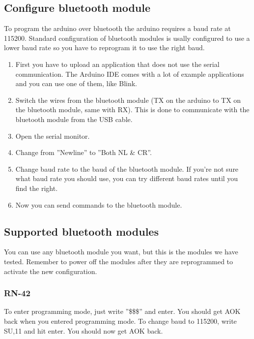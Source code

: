 		
		
		\subsection{Configure bluetooth module}
		To program the arduino over bluetooth the arduino requires a baud rate at 115200. Standard configuration of bluetooth modules is usally configured to use a lower baud rate so you have to reprogram it to use the right baud.\\
		
		\begin{enumerate}
		\item First you have to upload an application that does not use the serial communication. The Arduino IDE comes with a lot of example applications and you can use one of them, like Blink.
		
		\item Switch the wires from the bluetooth module (TX on the arduino to TX on the bluetooth module, same with RX). This is done to communicate with the bluetooth module from the USB cable.
		
		\item Open the serial monitor.
		
		\item Change from ''Newline'' to ''Both NL \& CR''.
		
		\item Change baud rate to the baud of the bluetooth module. If you're not sure what baud rate you should use, you can try different baud rates until you find the right.
		
		\item Now you can send commands to the bluetooth module.
		\end{enumerate}

			\subsection{Supported bluetooth modules}
			You can use any bluetooth module you want, but this is the modules we have tested. Remember to power off the modules after they are reprogrammed to activate the new configuration.
			
				\subsubsection{RN-42}
				To enter programming mode, just write ''\$\$\$'' and enter. You should get AOK back when you entered programming mode. To change baud to 115200, write SU,11 and hit enter. You should now get AOK back.\\
				

